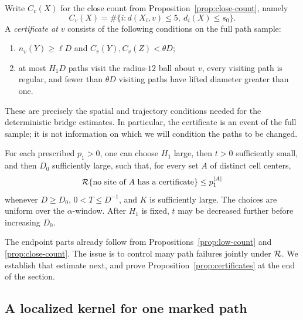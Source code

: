 Write $C_v(X)$ for the close count from
Proposition~\ref{prop:close-count}, namely
\[
 C_v(X)=\#\{i:d(X_i,v)\le5,\ d_i(X)\le s_0\}.
\]
A \emph{certificate at $v$} consists of the following conditions
on the full path sample:
\begin{enumerate}
 \item $n_v(Y)\ge\ell D$ and $C_v(Y),C_v(Z)<\theta D$;
 \item at most $H_1D$ paths visit the radius-$12$ ball about
 $v$, every visiting path is regular, and fewer than
 $\theta D$ visiting paths have lifted diameter greater than one.
\end{enumerate}
These are precisely the spatial and trajectory conditions needed
for the deterministic bridge estimates.  In particular, the
certificate is an event of the full sample; it is not information
on which we will condition the paths to be changed.

\begin{proposition}\label{prop:certificates}
For each prescribed $p_1>0$, one can choose $H_1$ large,
then $t>0$ sufficiently small, and then $D_0$ sufficiently
large, such that, for every set $A$ of distinct cell centers,
\begin{equation}\label{eq:joint-certificates}
 \mathcal R\{\text{no site of }A\text{ has a certificate}\}
 \le p_1^{|A|}
\end{equation}
whenever $D\ge D_0$, $0<T\le D^{-1}$, and $K$ is
sufficiently large.  The choices are uniform over the
$\alpha$-window.  After $H_1$ is fixed, $t$ may be decreased
further before increasing $D_0$.
\end{proposition}

The endpoint parts already follow from
Propositions~\ref{prop:low-count} and \ref{prop:close-count}.
The issue is to control many path failures jointly under
$\mathcal R$.  We establish that estimate next, and prove
Proposition~\ref{prop:certificates} at the end of the section.

\subsection{A localized kernel for one marked path}

